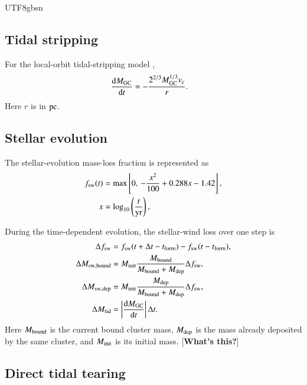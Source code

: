 \documentclass[trackchanges, twocolappendix, twocolumn]{aastex701}
\newcommand{\czkong}[1]{{\color{magenta}[\textbf{#1}]}}
\begin{document}
\begin{CJK*}{UTF8}{gbsn}
\subsection{Tidal stripping} \label{subsect:stripping}

For the local-orbit tidal-stripping model \citep{Fragione+2019GC},
\begin{align}
\dfrac{{\rm d}  M_{\rm GC}}{{\rm d}  t} & = - \dfrac{2^{2/3} M_{\rm GC}^{1/3} v_{\rm c}}{r} .
\label{eq:tidal_stripping}
\end{align}
Here $r$ is in $\rm pc$.

\subsection{Stellar evolution} \label{subsect:stellar_evo}

The stellar-evolution mass-loss fraction is represented as \citep{Conroy&Gunn2010}
\begin{align}
f_{\rm sw}(t) &=
\max\left[0,\,-\dfrac{x^2}{100}+0.288x-1.42\right],\\
x &= \log_{10}\left(\dfrac{t}{\rm yr}\right),
\label{eq:stellar_evolution}
\end{align}

During the time-dependent evolution, the stellar-wind loss over one step is
\begin{align}
\Delta f_{\rm sw} &=
f_{\rm sw}(t+\Delta t-t_{\rm form})
-f_{\rm sw}(t-t_{\rm form}),\\
\Delta M_{\rm sw,bound} &=
M_{\rm init}\dfrac{M_{\rm bound}}
{M_{\rm bound}+M_{\rm dep}}\Delta f_{\rm sw},\\
\Delta M_{\rm sw,dep} &=
M_{\rm init}\dfrac{M_{\rm dep}}
{M_{\rm bound}+M_{\rm dep}}\Delta f_{\rm sw},\\
\Delta M_{\rm tid} &=
\left|\dfrac{{\rm d} M_{\rm GC}}{{\rm d} t}\right|\Delta t.
\end{align}
Here $M_{\rm bound}$ is the current bound cluster mass, $M_{\rm dep}$ is the mass already deposited by the same cluster, and $M_{\rm init}$ is its initial mass. \czkong{What's this?}

\subsection{Direct tidal tearing} \label{subsect:tearing}


\end{CJK*}
\end{document}
